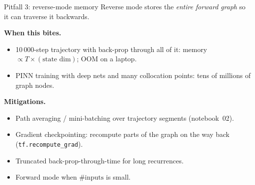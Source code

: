 \documentclass[aspectratio=169,11pt]{beamer}
\newcommand{\emphc}[1]{\textcolor{harvardcrimson}{#1}}
\begin{document}
\begin{frame}{Pitfall 3: reverse-mode memory}
\footnotesize Reverse mode stores the \emph{entire forward graph} so it can traverse it backwards.
\vspace{-2pt}
\begin{center}
\end{center}
\textbf{When this bites.}
\begin{itemize}\itemsep1pt
\item 10\,000-step trajectory with back-prop through all of it: memory $\propto T\times(\text{state dim})$; OOM on a laptop.
\item PINN training with deep nets and many collocation points: tens of millions of graph nodes.
\end{itemize}
\textbf{Mitigations.}
\begin{itemize}\itemsep1pt
\item \emphc{Path averaging / mini-batching} over trajectory segments (notebook~02).
\item \emphc{Gradient checkpointing}: recompute parts of the graph on the way back (\texttt{tf.recompute\_grad}).
\item \emphc{Truncated back-prop-through-time} for long recurrences.
\item \emphc{Forward mode} when $\#\text{inputs}$ is small.
\end{itemize}
\end{frame}
\end{document}
